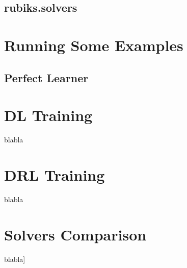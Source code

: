 \subsection{rubiks.solvers}


\section{Running Some Examples}


\subsection{Perfect Learner}
\label{PLSS}


\section{DL Training}

blabla
\section{DRL Training}

blabla


\section{Solvers Comparison}

blabla]